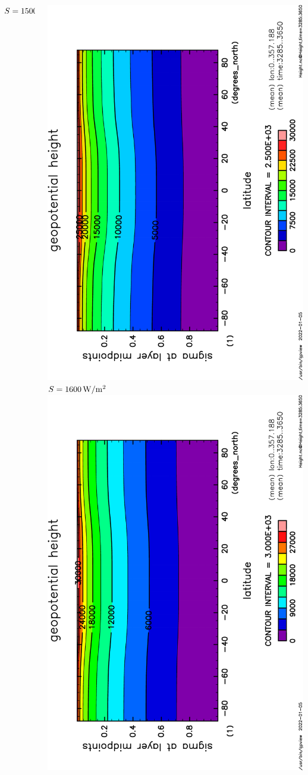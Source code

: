 \documentclass[aspectratio=149,9pt,fleqn]{beamer}
\begin{document}
\begin{frame}
\begin{columns}[T]
\begin{column}{.3\textwidth}
			\(S=1500\hmu{W/m^2}\)
		\end{column}
		\begin{column}{.3\textwidth}
			\centering
			\includegraphics[height=\textwidth,angle=-90]{S1600/Height,time=3285:3650-crop.pdf}
			\(S=1600\hmu{W/m^2}\)\\
			\includegraphics[height=\textwidth,angle=-90]{S1800/Height,time=3285:3650-crop.pdf}

\end{column}
\end{columns}
\end{frame}
\end{document}
